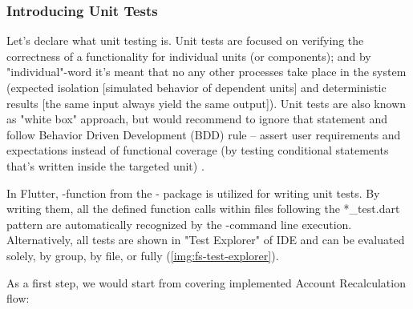 \subsubsection{Introducing Unit Tests} \label{ut-unit}

Let's declare what unit testing is. Unit tests are focused on verifying the correctness of a functionality for 
individual units (or components); and by "individual"-word it's meant that no any other processes take place in the 
system (expected isolation [simulated behavior of dependent units] and deterministic results [the same input always 
yield the same output]). Unit tests are also known as "white box" approach, but would recommend to ignore that 
statement and follow Behavior Driven Development (BDD) rule -- assert user requirements and expectations instead of 
functional coverage (by testing conditional statements that's written inside the targeted unit) \cite{Crispin09}.

In Flutter, -function from the - package is utilized for writing unit tests. By writing them, 
all the defined function calls within files following the *\_test.dart pattern are automatically recognized by the 
-command line execution. Alternatively, all tests are shown in "Test Explorer" of IDE and can be
evaluated solely, by group, by file, or fully (\cref{img:fs-test-explorer}).


As a first step, we would start from covering implemented Account Recalculation flow:

